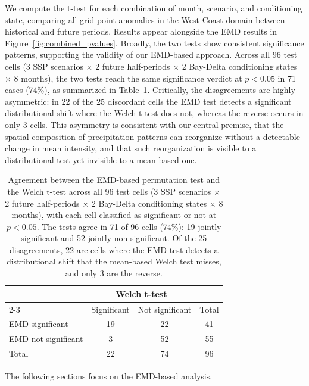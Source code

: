 We compute the t-test for each combination of month, scenario, and conditioning state, comparing all grid-point anomalies in the West Coast domain between historical and future periods.
%
Results appear alongside the EMD results in Figure~\ref{fig:combined_pvalues}.
%
Broadly, the two tests show consistent significance patterns, supporting the validity of our EMD-based approach.
%
Across all 96 test cells (3 SSP scenarios $\times$ 2 future half-periods $\times$ 2 Bay-Delta conditioning states $\times$ 8 months), the two tests reach the same significance verdict at $p < 0.05$ in 71 cases (74\%), as summarized in Table~\ref{tab:emd_welch_agreement}.
%
Critically, the disagreements are highly asymmetric: in 22 of the 25 discordant cells the EMD test detects a significant distributional shift where the Welch t-test does not, whereas the reverse occurs in only 3 cells.
%
This asymmetry is consistent with our central premise, that the spatial composition of precipitation patterns can reorganize without a detectable change in mean intensity, and that such reorganization is visible to a distributional test yet invisible to a mean-based one.
%
\begin{table}[t]
    \centering
    \begin{tabular}{lccc}
        \toprule
        & \multicolumn{2}{c}{Welch t-test} & \\
        \cmidrule(lr){2-3}
        & Significant & Not significant & Total \\
        \midrule
        EMD significant     & 19 & 22 & 41 \\
        EMD not significant & 3  & 52 & 55 \\
        \midrule
        Total               & 22 & 74 & 96 \\
        \bottomrule
    \end{tabular}
    \caption{Agreement between the EMD-based permutation test and the Welch t-test across all 96 test cells (3 SSP scenarios $\times$ 2 future half-periods $\times$ 2 Bay-Delta conditioning states $\times$ 8 months), with each cell classified as significant or not at $p < 0.05$. The tests agree in 71 of 96 cells (74\%): 19 jointly significant and 52 jointly non-significant. Of the 25 disagreements, 22 are cells where the EMD test detects a distributional shift that the mean-based Welch test misses, and only 3 are the reverse.}
    \label{tab:emd_welch_agreement}
\end{table}
%
The following sections focus on the EMD-based analysis.

